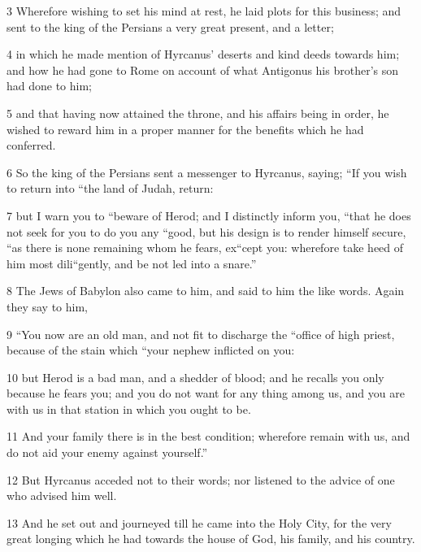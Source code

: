 \par 3 Wherefore wishing to set his mind at rest, he laid plots for this business; and sent to the king of the Persians a very great present, and a letter; 

\par 4 in which he made mention of Hyrcanus’ deserts and kind deeds towards him; and how he had gone to Rome on account of what Antigonus his brother’s son had done to him; 

\par 5 and that having now attained the throne, and his affairs being in order, he wished to reward him in a proper manner for the benefits which he had conferred. 

\par 6 So the king of the Persians sent a messenger to Hyrcanus, saying; “If you wish to return into “the land of Judah, return: 

\par 7 but I warn you to “beware of Herod; and I distinctly inform you, “that he does not seek for you to do you any “good, but his design is to render himself secure, “as there is none remaining whom he fears, ex“cept you: wherefore take heed of him most dili“gently, and be not led into a snare.” 

\par 8 The Jews of Babylon also came to him, and said to him the like words. Again they say to him, 

\par 9 “You now are an old man, and not fit to discharge the “office of high priest, because of the stain which “your nephew inflicted on you: 

\par 10 but Herod is a bad man, and a shedder of blood; and he recalls you only because he fears you; and you do not want for any thing among us, and you are with us in that station in which you ought to be. 

\par 11 And your family there is in the best condition; wherefore remain with us, and do not aid your enemy against yourself.” 

\par 12 But Hyrcanus acceded not to their words; nor listened to the advice of one who advised him well. 

\par 13 And he set out and journeyed till he came into the Holy City, for the very great longing which he had towards the house of God, his family, and his country. 

